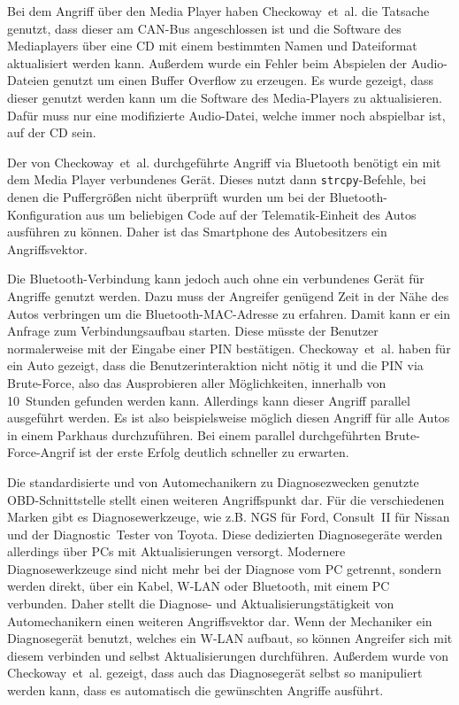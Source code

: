 Bei dem Angriff über den Media Player haben Checkoway~et~al. die Tatsache
genutzt, dass dieser am CAN-Bus angeschlossen ist und die Software des
Mediaplayers über eine CD mit einem bestimmten Namen und Dateiformat
aktualisiert werden kann. Außerdem wurde ein Fehler beim Abspielen der
Audio-Dateien genutzt um einen Buffer Overflow zu erzeugen. Es wurde gezeigt,
dass dieser genutzt werden kann um die Software des Media-Players zu
aktualisieren. Dafür muss nur eine modifizierte Audio-Datei, welche immer noch
abspielbar ist, auf der CD sein.

Der von Checkoway~et~al. durchgeführte Angriff via Bluetooth benötigt ein
mit dem Media Player verbundenes Gerät. Dieses nutzt dann
\verb+strcpy+-Befehle, bei denen die Puffergrößen nicht überprüft wurden um bei
der Bluetooth-Konfiguration aus um beliebigen Code auf der Telematik-Einheit
des Autos ausführen zu können. Daher ist das Smartphone des Autobesitzers ein
Angriffsvektor.

Die Bluetooth-Verbindung kann jedoch auch ohne ein verbundenes Gerät für
Angriffe genutzt werden. Dazu muss der Angreifer genügend Zeit in der Nähe des
Autos verbringen um die Bluetooth-MAC-Adresse zu erfahren. Damit kann er ein
Anfrage zum Verbindungsaufbau starten. Diese müsste der Benutzer normalerweise
mit der Eingabe einer PIN bestätigen. Checkoway~et~al. haben für ein Auto
gezeigt, dass die Benutzerinteraktion nicht nötig it und die PIN via
Brute-Force, also das Ausprobieren aller Möglichkeiten, innerhalb von
10~Stunden gefunden werden kann. Allerdings kann dieser Angriff parallel
ausgeführt werden. Es ist also beispielsweise möglich diesen Angriff für alle
Autos in einem Parkhaus durchzuführen. Bei einem parallel durchgeführten
Brute-Force-Angrif ist der erste Erfolg deutlich schneller zu erwarten.

Die standardisierte und von Automechanikern zu Diagnosezwecken genutzte
OBD-Schnittstelle stellt einen weiteren Angriffspunkt dar. Für die
verschiedenen Marken gibt es Diagnosewerkzeuge, wie z.B. NGS für Ford,
Consult~II für Nissan und der Diagnostic~Tester von Toyota. Diese dedizierten
Diagnosegeräte werden allerdings über PCs mit Aktualisierungen versorgt.
Modernere Diagnosewerkzeuge sind nicht mehr bei der Diagnose vom PC getrennt,
sondern werden direkt, über ein Kabel, W-LAN oder Bluetooth, mit einem PC
verbunden. Daher stellt die Diagnose- und Aktualisierungstätigkeit von
Automechanikern einen weiteren Angriffsvektor dar. Wenn der Mechaniker ein
Diagnosegerät benutzt, welches ein W-LAN aufbaut, so können Angreifer sich
mit diesem verbinden und selbst Aktualisierungen durchführen. Außerdem wurde
von Checkoway~et~al. gezeigt, dass auch das Diagnosegerät selbst so manipuliert
werden kann, dass es automatisch die gewünschten Angriffe ausführt.

